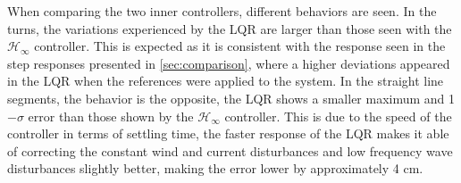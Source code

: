 When comparing the two inner controllers, different behaviors are seen. In the turns, the variations experienced by the LQR are larger than those seen with the $\mathcal{H}_\infty$ controller. This is expected as it is consistent with the response seen in the step responses presented in \autoref{sec:comparison}, where a higher deviations appeared in the LQR when the references were applied to the system. 
In the straight line segments, the behavior is the opposite, the LQR shows a smaller maximum and 1$-\sigma$ error than those shown by the $\mathcal{H}_\infty$ controller. This is due to the speed of the controller in terms of settling time, the faster response of the LQR makes it able of correcting the constant wind and current disturbances and low frequency wave disturbances slightly better, making the error lower by approximately 4 cm.
